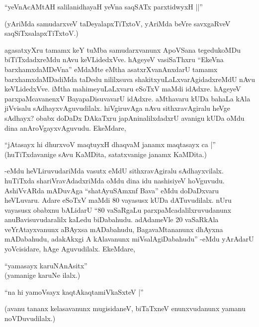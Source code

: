 \begin{shloka}
``yeVnAcAMtAH salilanidhayaH yeVna saqSATx parxtidwyxH ||''
\end{shloka}

(yAriMda samudarxveV taDeyalapxTiTxtoV, yAriMda beVre savxgaRveV saqSiTxsalapxTiTxtoV.)

agasatxyXru tamamx keY tuMba samudarxvanunx ApoVSana tegedukoMDu biTiTxdadxreMdu nAvu keVLidedxVve. hAgeyeV vasiSaThxru ``EkeVna barxhamxdaMDeVna'' eMdaMte eMtha asatxrXvanAnxdarU tamamx barxhamxdaMDadiMda taDedu nililxsuva shakitxyuLaLxvarAgidadxreMdU nAvu keVLidedxVve. iMtha mahimeyuLaLxvaru eSoTxV maMdi idAdxre. hAgeyeV parxpaMcavanenxV BayapaDisuvavarU idAdxre. aMthavaru kUDa bahaLa kAla jiVvisalu sAdhayxvAguvudilalx. hiVgiruvAga nAvu sithxravAgiralu heVge sAdhayx? obabx doDaDx DAkaTxru japAninalilxdadxrU avanigu kUDa oMdu dina anAroVgayxvAguvudu. EkeMdare,

\begin{shloka}
``jAtasayx hi dhurxvoV maqtuyxH dhaqvaM janamx maqtasayx ca |''\\
(huTiTxdavanige sAvu KaMDita, satatxvanige janamx KaMDita.)
\end{shloka}

-eMdu heVLiruvudariMda vasutx eMdU sithxravAgiralu sAdhayxvilalx. huTiTxda shariVravAdadxriMda oMdu dina idu nashisiyeV hoVguvudu. AshiVvARda mADuvAga ``shatAyuSAmxnf Bava'' eMdu doDaDxvaru heVLuvaru. Adare eSoTxV maMdi 80 vayasusx kUDa dATuvudilalx. nUru vayasusx obabxnu bALidarU ``80 vaSaRgaLu parxpaMcadalilxruvudanunx anuBavisuvudaralilx kaLedu biDabahudu. adAdameVle 20 vaSaRkAla veYrAtayxvanunx aBAyxsa mADabahudu, BagavaMtananunx dhAyxna mADabahudu, adakAkxgi A kAlavanunx miVsalAgiDabahudu'' -eMdu yArAdarU yoVcisidare, hAge Aguvudilalx. EkeMdare,

\begin{shloka}
``yamasayx karuNAnAsitx''\\
(yamanige karuNe ilalx.)
\end{shloka}

\begin{shloka}
``na hi yamoV\s sayx kaqtAkaqtamiVkaSxteV |''
\end{shloka}

(avanu tananx kelasavanunx mugisidaneV, biTaTxneV enunxvudanunx yamanu noVDuvudilalx.)

